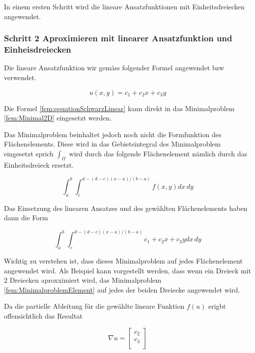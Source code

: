 In einem ersten Schritt wird die lineare Ansatzfunktionen mit Einheitsdreiecken angewendet.


\subsubsection{Schritt 2 Aproximieren mit linearer Ansatzfunktion und Einheisdreiecken
\label{fem:subsection:bonorum}}

Die lineare Ansatzfunktion wir gemäss folgender Formel angewendet bzw verwendet.

\begin{equation}
u(x,y) = c_1 + c_2x + c_3y
\label{fem:equationSchwarzLinear}
\end{equation}

Die Formel \ref{fem:equationSchwarzLinear} kann direkt in das Minimalproblem \ref{fem:Minimal2D} eingesetzt werden.

Das Minimalproblem beinhaltet jedoch noch nicht die Formfunktion des Flächenelements. Diese wird in das Gebietsintegral des Minimalproblem eingesetzt sprich $\int_{\Omega}$ wird durch das folgende Flächenelement nämlich durch das Einheitsdreieck ersetzt.

\begin{equation}
\int_a^b \int_c^{d-(d-c)(x-a)/(b-a)} f(x,y) dx\,dy
\label{fem:FlaecheDreieck}
\end{equation}

Das Einsetzung des linearen Ansatzes und des gewählten Flächenelements haben dann die Form

\begin{equation}
\int_a^b \int_c^{d-(d-c)(x-a)/(b-a)} c_1 + c_2x + c_3y dx \, dy
\label{fem:MinimalproblemElement}
\end{equation}

Wichtig zu verstehen ist, dass dieses Minimalproblem auf jedes Flächenelement angewendet wird. Als Beispiel kann vorgestellt werden, dass wenn ein Dreieck mit 2 Dreiecken aproxximiert wird, das Minimalproblem \ref{fem:MinimalproblemElement} auf jedes der beiden Dreiecke angewendet wird.

Da die partielle Ableitung für die gewählte lineare Funktion $f(u)$ erigbt offensichtlich das Resultat

\begin{equation}
	\nabla u = 	
	\left[ \begin{array}{r}
	c_2  \\
	c_3 \\
	\end{array}\right]
	\label{fem:equationSchwarzquadratischP}
\end{equation} 

